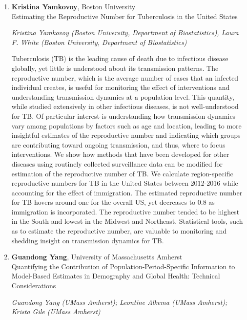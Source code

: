 \begin{enumerate}
\item \textbf{Kristina Yamkovoy}, Boston University \\
Estimating the Reproductive Number for Tuberculosis in the United States

\emph{\footnotesize Kristina Yamkovoy (Boston University, Department of Biostatistics), Laura F. White (Boston University, Department of Biostatistics)}

Tuberculosis (TB) is the leading cause of death due to infectious disease globally, yet little is understood about its transmission patterns. The reproductive number, which is the average number of cases that an infected individual creates, is useful for monitoring the effect of interventions and understanding transmission dynamics at a population level. This quantity, while studied extensively in other infectious diseases, is not well-understood for TB. Of particular interest is understanding how transmission dynamics vary among populations by factors such as age and location, leading to more insightful estimates of the reproductive number and indicating which groups are contributing toward ongoing transmission, and thus, where to focus interventions. We show how methods that have been developed for other diseases using routinely collected surveillance data can be modified for estimation of the reproductive number of TB. We calculate region-specific reproductive numbers for TB in the United States between 2012-2016 while accounting for the effect of immigration. The estimated reproductive number for TB hovers around one for the overall US, yet decreases to 0.8 as immigration is incorporated. The reproductive number tended to be highest in the South and lowest in the Midwest and Northeast. Statistical tools, such as to estimate the reproductive number, are valuable to monitoring and shedding insight on transmission dynamics for TB.

\item \textbf{Guandong Yang}, University of Massachusetts Amherst \\
Quantifying the Contribution of Population-Period-Specific Information to Model-Based Estimates in Demography and Global Health: Technical Considerations

\emph{\footnotesize Guandong Yang (UMass Amherst);  Leontine Alkema (UMass Amherst); Krista Gile (UMass Amherst)}


\end{enumerate}
